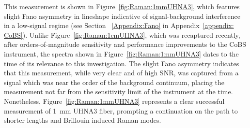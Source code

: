 This measurement is shown in Figure~\ref{fig:Raman:1mmUHNA3}, which features slight Fano asymmetry in lineshape indicative of signal-background interference in a low-signal regime (see Section ~\ref{Appendix:Fano} in Appendix~\ref{appendix: CoBS}). Unlike Figure~\ref{fig:Raman:1cmUHNA3}, which was recaptured recently, after orders-of-magnitude sensitivity and performance improvements to the \ac{CoBS} instrument, the spectra shown in Figure~\ref{fig:Raman:1mmUHNA3} dates to the time of its relevance to this investigation. The slight Fano asymmetry indicates that this measurement, while very clear and of high SNR, was captured from a signal which was near the order of the background continuum, placing the measurement not far from the sensitivity limit of the instrument at the time. Nonetheless, Figure~\ref{fig:Raman:1mmUHNA3} represents a clear successful measurement of \SI{1}{\milli\meter} \ac{UHNA3} fiber, prompting a continuation on the path to shorter lengths and Brillouin-induced Raman modes.

